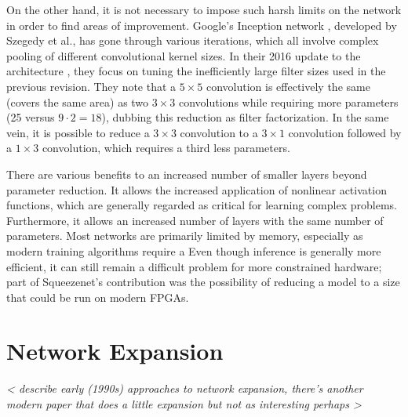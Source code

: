 On the other hand, it is not necessary to impose such harsh limits on the network in order to find areas of improvement.
Google's Inception network \cite{szegedy2015going}, developed by Szegedy et al., has gone through various iterations, which all involve complex pooling of different convolutional kernel sizes.
In their 2016 update to the architecture \cite{szegedy2016rethinking}, they focus on tuning the inefficiently large filter sizes used in the previous revision.
They note that a $5\times 5$ convolution is effectively the same (covers the same area) as two $3\times 3$ convolutions while requiring more parameters (25 versus $9 \cdot 2 = 18$), dubbing this reduction as filter factorization.
In the same vein, it is possible to reduce a $3\times 3$ convolution to a $3\times 1$ convolution followed by a $1\times 3$ convolution, which requires a third less parameters.

There are various benefits to an increased number of smaller layers beyond parameter reduction.
It allows the increased application of nonlinear activation functions, which are generally regarded as critical for learning complex problems.
Furthermore, it allows an increased number of layers with the same number of parameters.
Most networks are primarily limited by memory, especially as modern training algorithms require a 
Even though inference is generally more efficient, it can still remain a difficult problem for more constrained hardware; part of Squeezenet's contribution was the possibility of reducing a model to a size that could be run on modern FPGAs.


\section{Network Expansion}

\emph{ < describe early (1990s) approaches to network expansion, there's another modern paper that does a little expansion but not as interesting perhaps > }
